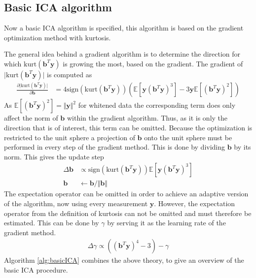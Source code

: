\subsection{Basic ICA algorithm}\label{sec:gra_kur}
Now a basic ICA algorithm is specified, this algorithm is based on the gradient optimization method with kurtosis.

The general idea behind a gradient algorithm is to determine the direction for which $\text{kurt}(\mathbf{b}^T \mathbf{y})$ is growing the most, based on the gradient. 
The gradient of $\vert \text{kurt}(\mathbf{b}^T \mathbf{y}) \vert$ is computed as
\begin{align}\label{eq:kurt}
\frac{\partial \vert \text{kurt}(\textbf{b}^T \textbf{y})\vert}{\partial \mathbf{b}} &= 4 \text{sign}(\text{kurt}(\textbf{b}^T \textbf{y})) (\mathbb{E}[\mathbf{y} (\textbf{b}^T \textbf{y})^3] - 3 \mathbf{y} \mathbb{E}[(\textbf{b}^T \textbf{y})^2]) 
\end{align} 
As $\mathbb{E}[(\mathbf{b}^T \mathbf{y})^2] = \Vert \mathbf{y} \Vert^2$ for whitened data the corresponding term does only affect the norm of $\mathbf{b}$ within the gradient algorithm. 
Thus, as it is only the direction that is of interest, this term can be omitted. 
Because the optimization is restricted to the unit sphere a projection of $\mathbf{b}$ onto the unit sphere must be performed in every step of the gradient method. 
This is done by dividing $\mathbf{b}$ by its norm. 
This gives the update step \cite[p. 178]{ICA}
\begin{align*}
\Delta \textbf{b} &\propto \text{sign}\left( \text{kurt}(\textbf{b}^T \textbf{y}) \right) \mathbb{E}[\textbf{y}(\textbf{b}^T \textbf{y})^3] \\
\textbf{b} &\leftarrow \textbf{b}/\Vert \textbf{b} \Vert
\end{align*}  
The expectation operator can be omitted in order to achieve an adaptive version of the algorithm, now using every measurement $\mathbf{y}$. 
However, the expectation operator from the definition of kurtosis can not be omitted and must therefore be estimated. 
This can be done by $\gamma$ by serving it as the learning rate of the gradient method.
\begin{align*}
\Delta \gamma \propto((\textbf{b}^T \textbf{y})^4 - 3) - \gamma
\end{align*}
Algorithm \ref{alg:basicICA} combines the above theory, to give an overview of the basic ICA procedure. 
